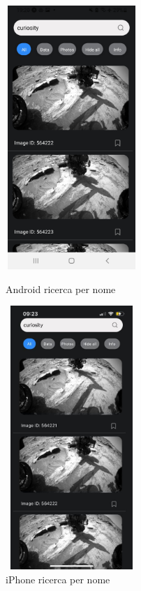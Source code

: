 \begin{figure}[h]
    \begin{minipage}[h]{0.47\textwidth}
        \centering
        \includegraphics[width=5cm, height=10cm]{images/immaginiAndroid/ricercaNomeRover.jpg}
        \caption{\label{ricercaNomeRoverAndroid} Android ricerca per nome}
    \end{minipage}
    \hfill
    \begin{minipage}[h]{0.47\textwidth}
        \centering
        \includegraphics[width=5cm, height=10cm]{images/immaginiPhone/ricercaNomeRover.jpeg}
        \caption{\label{ricercaNomeRoverIphone}iPhone ricerca per nome}
    \end{minipage}
\end{figure}

